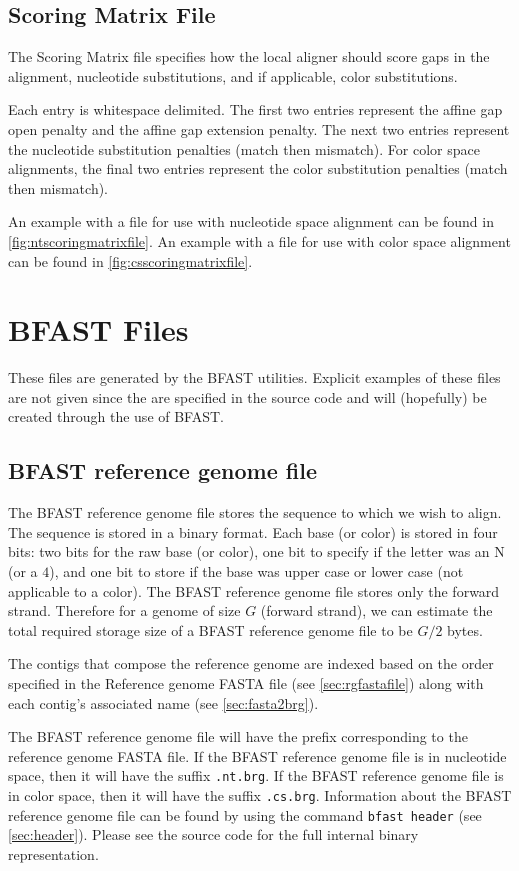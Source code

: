 \documentclass[a4paper,12pt]{book}
\newcommand{\TT}[1]{{\tt #1}} %
\newcommand{\rGFF}{reference genome FASTA file}
\newcommand{\RGFF}{Reference genome FASTA file}
\newcommand{\BRGF}{BFAST reference genome file} %
\begin{document}
\subsection{Scoring Matrix File}
\label{sec:scoringmatrixfile}
The Scoring Matrix file specifies how the local aligner should score gaps in the alignment, nucleotide substitutions, and if applicable, color substitutions.

Each entry is whitespace delimited.
The first two entries represent the affine gap open penalty and the affine gap extension penalty.
The next two entries represent the nucleotide substitution penalties (match then mismatch).
For color space alignments, the final two entries represent the color substitution penalties (match then mismatch).

An example with a file for use with nucleotide space alignment can be found in \autoref{fig:ntscoringmatrixfile}.
An example with a file for use with color space alignment can be found in \autoref{fig:csscoringmatrixfile}.

\section{BFAST Files}
These files are generated by the BFAST utilities. 
Explicit examples of these files are not given since the are specified in the source code and will (hopefully) be created through the use of BFAST.
\label{sec:bfastfiles}
\subsection{\BRGF{}}
\label{sec:brgf}
The \BRGF{} stores the sequence to which we wish to align.
The sequence is stored in a binary format.
Each base (or color) is stored in four bits: two bits for the raw base (or color), one bit to specify if the letter was an N (or a $4$), and one bit to store if the base was upper case or lower case (not applicable to a color).
The \BRGF{} stores only the forward strand.
Therefore for a genome of size $G$ (forward strand), we can estimate the total required storage size of a \BRGF{} to be $G/2$ bytes.

The contigs that compose the reference genome are indexed based on the order specified in the \RGFF{} (see \autoref{sec:rgfastafile}) along with each contig's associated name (see \autoref{sec:fasta2brg}).

The \BRGF{} will have the prefix corresponding to the \rGFF{}.
If the \BRGF{} is in nucleotide space, then it will have the suffix \TT{.nt.brg}.
If the \BRGF{} is in color space, then it will have the suffix \TT{.cs.brg}.
Information about the \BRGF{} can be found by using the command \TT{bfast header} (see \autoref{sec:header}).
Please see the source code for the full internal binary representation.
\end{document}
